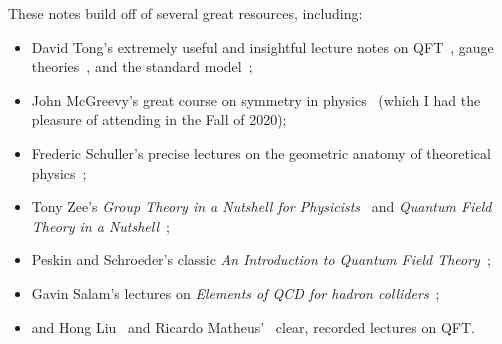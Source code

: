 These notes build off of several great resources, including:
\begin{itemize}
	\item David Tong's extremely useful and insightful lecture notes on QFT~\cite{TongQFT}, gauge theories~\cite{TongGT}, and the standard model~\cite{TongSM};
	\item John McGreevy's great course on symmetry in physics~\cite{McGreevyGT} (which I had the pleasure of attending in the Fall of 2020);
	\item Frederic Schuller's precise lectures on the geometric anatomy of theoretical physics~\cite{SchullerGATP};
	\item Tony Zee's \textit{Group Theory in a Nutshell for Physicists}~\cite{Zee:2016fuk} and \textit{Quantum Field Theory in a Nutshell}~\cite{Zee:2003mt};
	\item Peskin and Schroeder's classic \textit{An Introduction to Quantum Field Theory}~\cite{Peskin:1995ev};
	\item Gavin Salam's lectures on \textit{Elements of QCD for hadron colliders}~\cite{Salam:2010zt};
	\item and Hong Liu~\cite{LiuRQFT} and Ricardo Matheus'~\cite{MatheusQFT} clear, recorded lectures on QFT.
\end{itemize}
